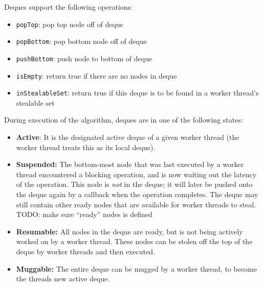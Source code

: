 \documentclass[bsc,frontabs,singlespacing,parskip,deptreport,normalheadings]{infthesis}
\begin{document}
Deques support the following operations:

\begin{itemize}
    \item \texttt{popTop}: pop top node off of deque
    \item \texttt{popBottom}: pop bottom node off of deque
    \item \texttt{pushBottom}: push node to bottom of deque
    \item \texttt{isEmpty}: return true if there are no nodes in deque
    \item \texttt{inStealableSet}: return true if this deque is to be found in a
        worker thread's stealable set
\end{itemize}

During execution of the algorithm, deques are in one of the following states:

\begin{itemize}
    \item \textbf{Active}: It is the designated active deque of a given worker
        thread (the worker thread treats this as its local deque).
    \item \textbf{Suspended:} The bottom-most node that was last executed by a
        worker thread encountered a blocking operation, and is now waiting out
        the latency of the operation. This node is \textit{not} in the deque; it
        will later be pushed onto the deque again by a callback when the
        operation completes. The deque may still contain other ready nodes that
        are available for worker threads to steal. TODO: make sure ``ready''
        nodes is defined
    \item \textbf{Resumable:} All nodes in the deque are ready, but is not being
        actively worked on by a worker thread. These nodes can be stolen off the
        top of the deque by worker threads and then executed.
    \item \textbf{Muggable:} The entire deque can be mugged by a worker thread,
        to become the threads new active deque.
\end{itemize}
\end{document}
